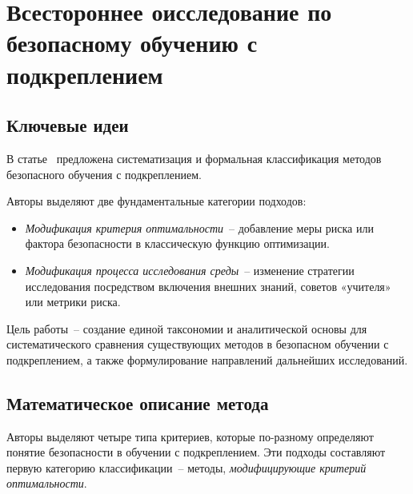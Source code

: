 \section{Всестороннее оисследование по безопасному обучению с подкреплением}

\subsection{Ключевые идеи}

В статье~\cite{garcia2015} предложена систематизация и формальная классификация методов безопасного обучения с подкреплением.

Авторы выделяют две фундаментальные категории подходов:
\begin{itemize}
    \item \emph{Модификация критерия оптимальности}~-- добавление меры риска или фактора безопасности в классическую функцию оптимизации.
    \item \emph{Модификация процесса исследования среды}~-- изменение стратегии исследования посредством включения внешних знаний, советов «учителя» или метрики риска.
\end{itemize}

Цель работы~-- создание единой таксономии и аналитической основы для систематического сравнения существующих методов в безопасном обучении с подкреплением, а также формулирование направлений дальнейших исследований.
\subsection{Математическое описание метода}

Авторы выделяют четыре типа критериев, которые по-разному определяют понятие безопасности в обучении с подкреплением.  
Эти подходы составляют первую категорию классификации~-- методы, \emph{модифицирующие критерий оптимальности}.

